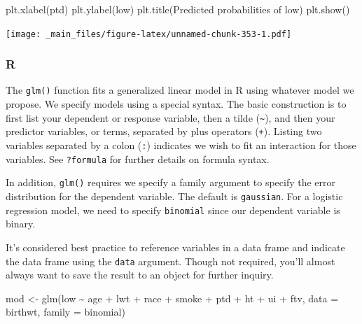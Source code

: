 \documentclass[
]{book}
\newenvironment{Shaded}{\begin{snugshade}}{\end{snugshade}}
\newcommand{\AttributeTok}[1]{\textcolor[rgb]{0.77,0.63,0.00}{#1}}
\newcommand{\FunctionTok}[1]{\textcolor[rgb]{0.00,0.00,0.00}{#1}}
\newcommand{\NormalTok}[1]{#1}
\newcommand{\OtherTok}[1]{\textcolor[rgb]{0.56,0.35,0.01}{#1}}
\newcommand{\SpecialCharTok}[1]{\textcolor[rgb]{0.00,0.00,0.00}{#1}}
\newcommand{\StringTok}[1]{\textcolor[rgb]{0.31,0.60,0.02}{#1}}
\begin{document}
\begin{Shaded}
\begin{Highlighting}[]
\NormalTok{plt.xlabel(}\StringTok{\textquotesingle{}ptd\textquotesingle{}}\NormalTok{)}
\NormalTok{plt.ylabel(}\StringTok{\textquotesingle{}low\textquotesingle{}}\NormalTok{)}
\NormalTok{plt.title(}\StringTok{\textquotesingle{}Predicted probabilities of low\textquotesingle{}}\NormalTok{)}
\NormalTok{plt.show()}
\end{Highlighting}
\end{Shaded}

\texttt{[image: \_main\_files/figure-latex/unnamed-chunk-353-1.pdf]}

\hypertarget{r-50}{%
\subsubsection*{R}\label{r-50}}

The \texttt{glm()} function fits a generalized linear model in R using whatever model we propose. We specify models using a special syntax. The basic construction is to first list your dependent or response variable, then a tilde (\texttt{\textasciitilde{}}), and then your predictor variables, or terms, separated by plus operators (\texttt{+}). Listing two variables separated by a colon (\texttt{:}) indicates we wish to fit an interaction for those variables. See \texttt{?formula} for further details on formula syntax.

In addition, \texttt{glm()} requires we specify a family argument to specify the error distribution for the dependent variable. The default is \texttt{gaussian}. For a logistic regression model, we need to specify \texttt{binomial} since our dependent variable is binary.

It's considered best practice to reference variables in a data frame and indicate the data frame using the \texttt{data} argument. Though not required, you'll almost always want to save the result to an object for further inquiry.

\begin{Shaded}
\begin{Highlighting}[]
\NormalTok{mod }\OtherTok{\textless{}{-}} \FunctionTok{glm}\NormalTok{(low }\SpecialCharTok{\textasciitilde{}}\NormalTok{ age }\SpecialCharTok{+}\NormalTok{ lwt }\SpecialCharTok{+}\NormalTok{ race }\SpecialCharTok{+} 
\NormalTok{             smoke }\SpecialCharTok{+}\NormalTok{ ptd }\SpecialCharTok{+}\NormalTok{ ht }\SpecialCharTok{+} 
\NormalTok{             ui }\SpecialCharTok{+}\NormalTok{ ftv, }
           \AttributeTok{data =}\NormalTok{ birthwt, }\AttributeTok{family =}\NormalTok{ binomial)}
\end{Highlighting}
\end{Shaded}
\end{document}
